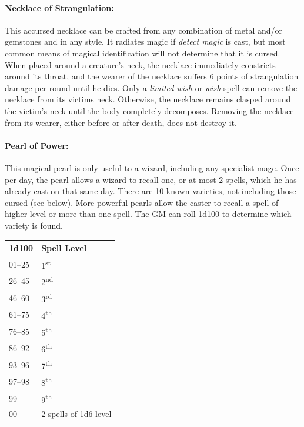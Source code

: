 \begin{multicols}{2}

\paragraph{Necklace of Strangulation:} This accursed necklace can be crafted from any combination of metal and/or gemstones and in any style.  It radiates magic if \textit{detect magic} is cast, but most common means of magical identification will not determine that it is cursed.  When placed around a creature's neck, the necklace immediately constricts around its throat, and the wearer of the necklace suffers 6 points of strangulation damage per round until he dies.  Only a \textit{limited wish} or \textit{wish} spell can remove the necklace from its victims neck.  Otherwise, the necklace remains clasped around the victim's neck until the body completely decomposes.  Removing the necklace from its wearer, either before or after death, does not destroy it.

\paragraph{Pearl of Power:} This magical pearl is only useful to a wizard, including any specialist mage.  Once per day, the pearl allows a wizard to recall one, or at most 2 spells, which he has already cast on that same day.  There are 10 known varieties, not including those cursed (see below).  More powerful pearls allow the caster to recall a spell of higher level or more than one spell.  The GM can roll 1d100 to determine which variety is found.  
 
\noindent
\begin{tabular}{|p{}|p{}|}
\hline
1d100	& Spell Level \\
\hline\hline
\rowcolor[gray]{.9}01--25	& 1\textsuperscript{st} \\
26--45	& 2\textsuperscript{nd} \\
\rowcolor[gray]{.9}46--60	& 3\textsuperscript{rd} \\
61--75	& 4\textsuperscript{th} \\
\rowcolor[gray]{.9}76--85	& 5\textsuperscript{th} \\
86--92	& 6\textsuperscript{th} \\
\rowcolor[gray]{.9}93--96	& 7\textsuperscript{th} \\
97--98	& 8\textsuperscript{th} \\
\rowcolor[gray]{.9}99 	& 9\textsuperscript{th} \\
00	& 2 spells of 1d6 level \\
\hline
\end{tabular}


\end{multicols}

